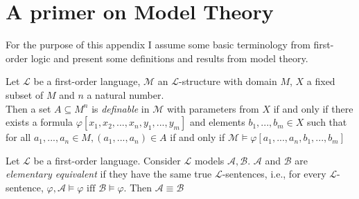 \chapter{A primer on Model Theory}
\label{chap:model-theory}
For the purpose of this appendix I assume some basic terminology from first-order logic and present some definitions and results from model theory.

\begin{definition}
    \label{def:definable-set}
    Let $\mathcal{L}$ be a first-order language, $\mathcal{M}$ an $\mathcal{L}$-structure with domain $M$, $X$ a fixed subset of $M$ and $n$ a natural number. \\
    Then a set $A\subseteq M^n$ is \textit{definable} in $\mathcal{M}$ with parameters from $X$ if and only if there exists a formula $\varphi[x_1,x_2,...,x_n,y_1,...,y_m]$ and elements $b_1,...,b_m\in X$ such that for all $a_1,...,a_n\in M, (a_1,...,a_n)\in A$ if and only if $\mathcal{M}\models\varphi[a_1,...,a_n,b_1,...,b_m]$
\end{definition}

\begin{definition}
    \label{def:elementary-equivalence}
    Let $\mathcal{L}$ be a first-order language. Consider $\mathcal{L}$ models $\mathcal{A}, \mathcal{B}$. $\mathcal{A}$ and $\mathcal{B}$ are \textit{elementary equivalent} if they have the same true $\mathcal{L}$-sentences, i.e., for every $\mathcal{L}$-sentence, $\varphi, \mathcal{A}\models\varphi \text{ iff }\mathcal{B}\models\varphi$. Then $\mathcal{A}\equiv\mathcal{B}$ 
\end{definition}